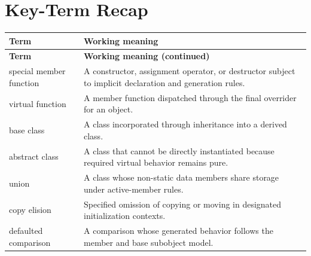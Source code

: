 \documentclass[11pt,letterpaper]{article}
\begin{document}
\section{Key-Term Recap}
\begin{longtable}{@{}>{\RaggedRight\arraybackslash}p{}>{\RaggedRight\arraybackslash}p{}@{}}\toprule\textbf{Term} & \textbf{Working meaning}\\\midrule\endfirsthead\toprule\textbf{Term} & \textbf{Working meaning (continued)}\\\midrule\endhead\bottomrule\endfoot
special member function & A constructor, assignment operator, or destructor subject to implicit declaration and generation rules.\\
virtual function & A member function dispatched through the final overrider for an object.\\
base class & A class incorporated through inheritance into a derived class.\\
abstract class & A class that cannot be directly instantiated because required virtual behavior remains pure.\\
union & A class whose non-static data members share storage under active-member rules.\\
copy elision & Specified omission of copying or moving in designated initialization contexts.\\
defaulted comparison & A comparison whose generated behavior follows the member and base subobject model.\\
\end{longtable}
\end{document}
